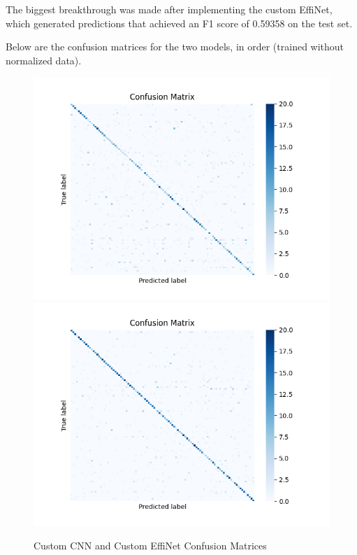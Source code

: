 \documentclass{article}
\begin{document}
The biggest breakthrough was made after implementing the custom EffiNet, which generated predictions that achieved an F1 score of 0.59358 on the test set.

Below are the confusion matrices for the two models, in order (trained without normalized data).

\newpage 

\begin{figure}[hbt!]
	\centering
	\includegraphics[scale=0.58]{custom_cnn_conf_matrix.png}
	\includegraphics[scale=0.58]{effinet_conf_matrix.png}
	\caption{Custom CNN and Custom EffiNet Confusion Matrices}
\end{figure}
\end{document}
